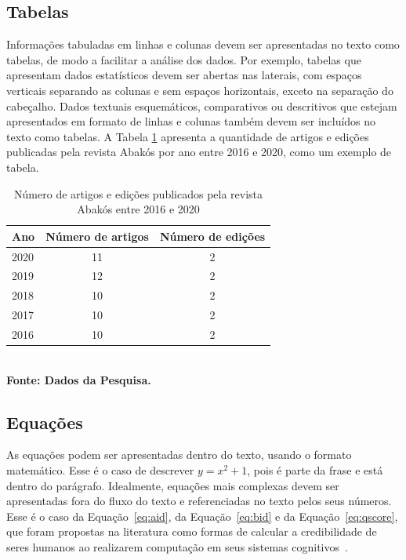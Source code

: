 \documentclass[a4paper,12pt]{article}
\begin{document}
\subsection{Tabelas}

Informações tabuladas em linhas e colunas devem ser apresentadas no texto como tabelas, de modo a facilitar a análise dos dados. Por exemplo, tabelas que apresentam dados estatísticos devem ser abertas nas laterais, com espaços verticais separando as colunas e sem espaços horizontais, exceto na separação do cabeçalho. Dados textuais esquemáticos, comparativos ou descritivos que estejam apresentados em formato de linhas e colunas também devem ser incluídos no texto como tabelas. A Tabela \ref{tab:tabela1} apresenta a quantidade de artigos e edições publicadas pela revista Abakós por ano entre 2016 e 2020, como um exemplo de tabela.

\begin{table}[ht]
	\centering
	\caption{Número de artigos e edições publicados pela revista Abakós entre 2016 e 2020}
	\label{tab:tabela1}
	\begin{tabular}{l|c|c}
  \hline
    \textbf{Ano}	& \textbf{Número de artigos} & \textbf{Número de edições} \\
    \hline
     2020	& 11 &  2 \\
     2019	& 12 &  2 \\
     2018	& 10 &  2 \\
     2017   & 10  &  2 \\
     2016	& 10  &  2 \\
     \hline
 \end{tabular}
	{\footnotesize\\ \textbf{Fonte: Dados da Pesquisa.}}
\end{table}


\subsection{\esp Equações}

As equações podem ser apresentadas dentro do texto, usando o formato matemático. Esse é o caso de descrever $y=x^2+1$, pois é parte da frase e está dentro do parágrafo. Idealmente, equações mais complexas devem ser apresentadas fora do fluxo do texto e referenciadas no texto pelos seus números. Esse é o caso da Equação~\ref{eq:aid}, da Equação~\ref{eq:bid} e da Equação~\ref{eq:qscore}, que foram propostas na literatura como formas de calcular a credibilidade de seres humanos ao realizarem computação em seus sistemas cognitivos~\cite{ponciano2018agreement}. 
\end{document}
